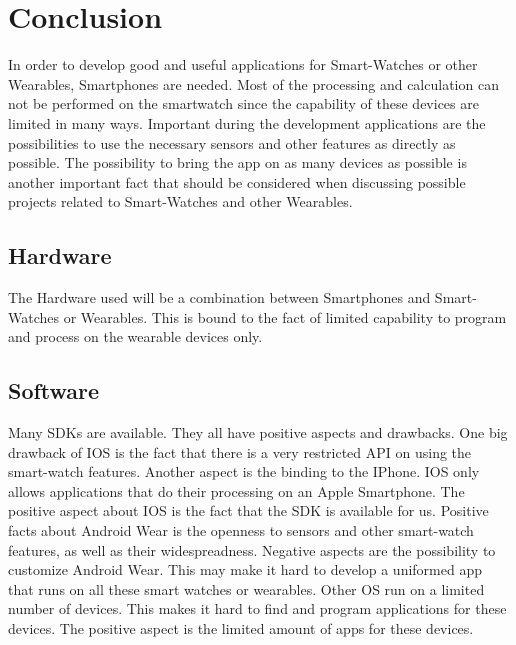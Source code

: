 \section{Conclusion}

In order to develop good and useful applications for Smart-Watches or other Wearables, Smartphones are needed. Most of the processing and calculation can not be performed on the smartwatch since the capability of these devices are limited in many ways.
Important during the development applications are the possibilities to use the necessary sensors and other features as directly as possible. 
The possibility to bring the app on as many devices as possible is another important fact that should be considered when discussing possible projects related to Smart-Watches and other Wearables. 

\subsection{Hardware}
The Hardware used will be a combination between Smartphones and Smart-Watches or Wearables. This is bound to the fact of limited capability to program and process on the wearable devices only.

\subsection{Software}
Many SDKs are available. They all have positive aspects and drawbacks. 
One big drawback of IOS is the fact that there is a very restricted API on using the smart-watch features. Another aspect is the binding to the IPhone. IOS only allows applications that do their processing on an Apple Smartphone.
The positive aspect about IOS is the fact that the SDK is available for us.
Positive facts about Android Wear is the openness to sensors and other smart-watch features, as well as their widespreadness. 
Negative aspects are the possibility to customize Android Wear. This may make it hard to develop a uniformed app that runs on all these smart watches or wearables. 
Other OS run on a limited number of devices. This makes it hard to find and program applications for these devices. The positive aspect is the limited amount of apps for these devices. 